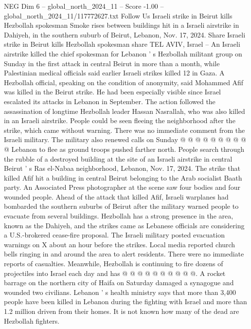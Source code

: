 \begin{textsample}{NEG Dim 6 – global\_north\_2024\_11 – Score -1.00 – global\_north\_2024\_11/117772627.txt}  \label{ex:f6_neg_105}
Follow Us Israeli strike in Beirut kills Hezbollah spokesman Smoke rises between buildings hit in a Israeli airstrike in Dahiyeh, in the southern suburb of Beirut, Lebanon, Nov. 17, 2024.
Share Israeli strike in Beirut kills Hezbollah spokesman share TEL AVIV, Israel -- An Israeli airstrike killed the chief spokesman for Lebanon ' s Hezbollah militant group on Sunday in the first attack in central Beirut in more than a month, while Palestinian medical officials said earlier Israeli strikes killed 12 in Gaza.
A Hezbollah official, speaking on the condition of anonymity, said Mohammed Afif was killed in the Beirut strike.
He had been especially visible since Israel escalated its attacks in Lebanon in September.
The action followed the assassination of longtime Hezbollah leader Hassan Nasrallah, who was also killed in an Israeli airstrike.
People could be seen fleeing the neighborhood after the strike, which came without warning.
There was no immediate comment from the Israeli military.
The military also renewed calls on Sunday @ @ @ @ @ @ @ @ @ @ Lebanon to flee as ground troops pushed farther north.
People search through the rubble of a destroyed building at the site of an Israeli airstrike in central Beirut ' s Ras el-Nabaa neighborhood, Lebanon, Nov. 17, 2024.
The strike that killed Afif hit a building in central Beirut belonging to the Arab socialist Baath party.
An Associated Press photographer at the scene saw four bodies and four wounded people.
Ahead of the attack that killed Afif, Israeli warplanes had bombarded the southern suburbs of Beirut after the military warned people to evacuate from several buildings.
Hezbollah has a strong presence in the area, known as the Dahiyeh, and the strikes came as Lebanese officials are considering a U.S.-brokered cease-fire proposal.
The Israeli military posted evacuation warnings on X about an hour before the strikes.
Local media reported church bells ringing in and around the area to alert residents.
There were no immediate reports of casualties.
Meanwhile, Hezbollah is continuing to fire dozens of projectiles into Israel each day and has @ @ @ @ @ @ @ @ @ @.
A rocket barrage on the northern city of Haifa on Saturday damaged a synagogue and wounded two civilians.
Lebanon ' s health ministry says that more than 3,400 people have been killed in Lebanon during the fighting with Israel and more than 1.2 million driven from their homes.
It is not known how many of the dead are Hezbollah fighters.

\end{textsample}
